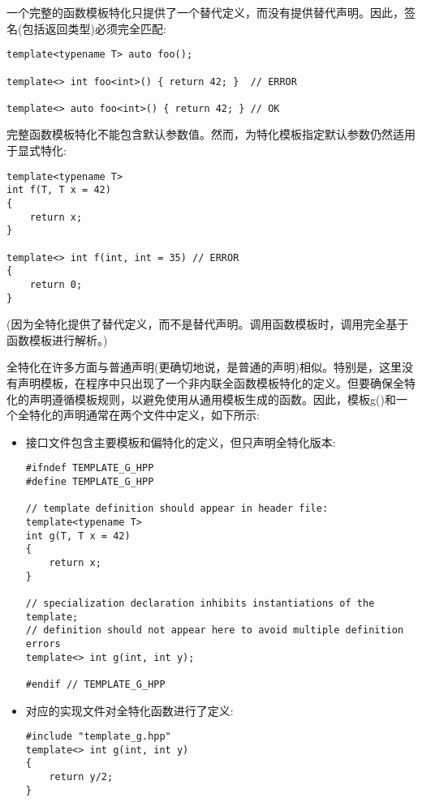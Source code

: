 一个完整的函数模板特化只提供了一个替代定义，而没有提供替代声明。因此，签名(包括返回类型)必须完全匹配:

\begin{lstlisting}[style=styleCXX]
template<typename T> auto foo();

template<> int foo<int>() { return 42; }  // ERROR

template<> auto foo<int>() { return 42; } // OK
\end{lstlisting}

完整函数模板特化不能包含默认参数值。然而，为特化模板指定默认参数仍然适用于显式特化:

\begin{lstlisting}[style=styleCXX]
template<typename T>
int f(T, T x = 42)
{
	return x;
}

template<> int f(int, int = 35) // ERROR
{
	return 0;
}
\end{lstlisting}

(因为全特化提供了替代定义，而不是替代声明。调用函数模板时，调用完全基于函数模板进行解析。)

全特化在许多方面与普通声明(更确切地说，是普通的声明)相似。特别是，这里没有声明模板，在程序中只出现了一个非内联全函数模板特化的定义。但要确保全特化的声明遵循模板规则，以避免使用从通用模板生成的函数。因此，模板g()和一个全特化的声明通常在两个文件中定义，如下所示:

\begin{itemize}
\item 
接口文件包含主要模板和偏特化的定义，但只声明全特化版本:

\begin{lstlisting}[style=styleCXX]
#ifndef TEMPLATE_G_HPP
#define TEMPLATE_G_HPP

// template definition should appear in header file:
template<typename T>
int g(T, T x = 42)
{
	return x;
}

// specialization declaration inhibits instantiations of the template;
// definition should not appear here to avoid multiple definition errors
template<> int g(int, int y);

#endif // TEMPLATE_G_HPP
\end{lstlisting}

\item 
对应的实现文件对全特化函数进行了定义:

\begin{lstlisting}[style=styleCXX]
#include "template_g.hpp"
template<> int g(int, int y)
{
	return y/2;
}
\end{lstlisting}
\end{itemize}

